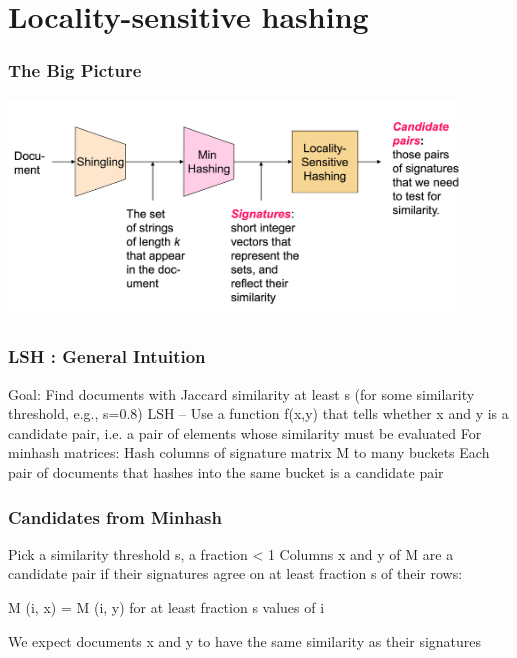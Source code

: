 \documentclass[svgnames]{beamer}
\begin{document}
  
\section{Locality-sensitive hashing}

  
\begin{frame} \frametitle{The Big Picture}

\includegraphics[width=12cm]{overall}

\end{frame}

  
\begin{frame} \frametitle{LSH : General Intuition}

Goal: Find documents with Jaccard similarity at least s (for some similarity threshold, e.g., s=0.8)
LSH -- Use a function f(x,y) that tells whether x and y is a candidate pair, i.e. a pair of elements whose similarity must be evaluated
For minhash matrices:
  Hash columns of signature matrix M to many buckets
  Each pair of documents that hashes into the same bucket is a candidate pair
  
\end{frame}

  
\begin{frame} \frametitle{Candidates from Minhash}

Pick a similarity threshold s, a fraction < 1
Columns x and y of M are a candidate pair if their signatures agree on at least fraction s of their rows: 

M (i, x) = M (i, y) for at least fraction s values of i

We expect documents x and y to have the same similarity as their signatures

\end{frame}

  
\end{document}
